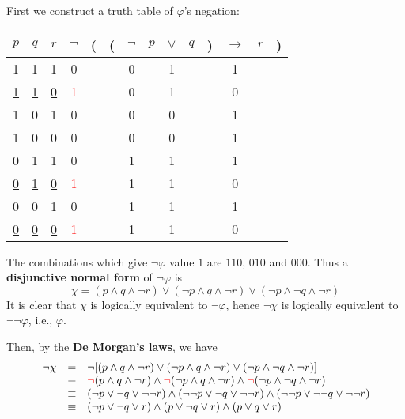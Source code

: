 \documentclass[UTF8,12pt,a4paper]{ctexart}
\begin{document}
First we construct a truth table of $\varphi$'s {\color{red} negation}:
\begin{center}
	\begin{tabular}{@{ }c@{ }@{ }c@{ }@{ }c | c@{ }@{}c@{}@{}c@{}@{ }c@{ }@{ }c@{ }@{ }c@{ }@{ }c@{ }@{}c@{}@{ }c@{ }@{ }c@{ }@{}c@{ }}
		$p$ & $q$ & $r$ & {\color{red} $\lnot$} & ( & ( & $\lnot$ & $p$ & $\lor$ & $q$ & ) & $\rightarrow$ & $r$ & )\\
		\hline 
		1 & 1 & 1 & 0 &  &  & 0 &  & 1 &  &  & 1 &  & \\
		\underline{1} & \underline{1} & \underline{0} & \textcolor{red}{1} &  &  & 0 &  & 1 &  &  & 0 &  & \\
		1 & 0 & 1 & 0 &  &  & 0 &  & 0 &  &  & 1 &  & \\
		1 & 0 & 0 & 0 &  &  & 0 &  & 0 &  &  & 1 &  & \\
		0 & 1 & 1 & 0 &  &  & 1 &  & 1 &  &  & 1 &  & \\
		\underline{0} & \underline{1} & \underline{0} & \textcolor{red}{1} &  &  & 1 &  & 1 &  &  & 0 &  & \\
		0 & 0 & 1 & 0 &  &  & 1 &  & 1 &  &  & 1 &  & \\
		\underline{0} & \underline{0} & \underline{0} & \textcolor{red}{1} &  &  & 1 &  & 1 &  &  & 0 &  & \\
	\end{tabular}
\end{center}

The combinations which give $\neg \varphi$ value $1$ are $110$, $010$ and $000$. 
Thus a \textbf{disjunctive normal form} of $\neg \varphi$ is
\[
\chi = (p \land q \land \neg r) \lor (\neg p \land q \land \neg r) \lor (\neg p \land  \neg q \land \neg r)
\] 
It is clear that $\chi$ is logically equivalent to $\neg \varphi$, 
hence $\neg \chi $ is  logically equivalent to $ \neg \neg \varphi$, i.e., $\varphi$.

Then, by the \textbf{De Morgan’s laws}, we have
\[\begin{array}{l l l}
	\neg \chi 
	&=&   
	\neg [ (p \land q \land \neg r) \lor (\neg p \land q \land \neg r) \lor (\neg p \land  \neg q \land \neg r)  ] \\
	
	&\equiv&   
	{\color{red} \neg} (p \land q \land \neg r) \land {\color{red} \neg} (\neg p \land q \land \neg r) \land {\color{red} \neg} (\neg p \land  \neg q \land \neg r)  \\
	
	&\equiv&   
	( \neg p \lor \neg q \lor  \neg \neg r) \land  ( \neg \neg p \lor \neg q \lor \neg \neg r) \land  (\neg \neg p \lor \neg  \neg q \lor \neg \neg r)  \\
	
	&\equiv&   
	( \neg p \lor \neg q \lor  r) \land  ( p \lor \neg q \lor r) \land  ( p \lor  q \lor r)  \\
\end{array}\]
\end{document}
